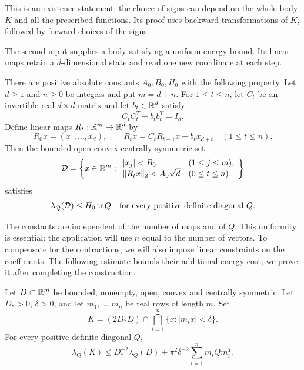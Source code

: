 This is an existence statement; the choice of signs can depend on the whole
body $K$ and all the prescribed functions.  Its proof uses backward
transformations of $K$, followed by forward choices of the signs.

The second input supplies a body satisfying a uniform energy bound.  Its
linear maps retain a $d$-dimensional state and read one new coordinate at
each step.

\begin{proposition}\label{prop:filtered}
There are positive absolute constants $A_0,B_0,H_0$ with the following
property.  Let $d\ge1$ and $n\ge0$ be integers and put $m=d+n$.  For
$1\le t\le n$, let $C_t$ be an invertible real $d\times d$ matrix and let
$b_t\in\mathbb R^d$ satisfy
\[
 C_tC_t^T+b_tb_t^T=I_d.
\]
Define linear maps $R_t:\mathbb R^m\to\mathbb R^d$ by
\begin{equation}\label{eq:filter-recursion}
 R_0x=(x_1,\ldots,x_d),\qquad
 R_tx=C_tR_{t-1}x+b_tx_{d+t}\quad(1\le t\le n).
\end{equation}
Then the bounded open convex centrally symmetric set
\begin{equation}\label{eq:filtered-body}
 \mathcal D=
 \left\{x\in\mathbb R^m:
 \begin{array}{ll}
 |x_j|<B_0 & (1\le j\le m),\\
 \lVert R_tx\rVert_2<A_0\sqrt d & (0\le t\le n)
 \end{array}\right\}
\end{equation}
satisfies
\[
 \lambda_Q(\mathcal D)\le H_0\operatorname{tr} Q
 \quad\text{for every positive definite diagonal }Q.
\]
\end{proposition}

The constants are independent of the number of maps and of $Q$.  This
uniformity is essential: the application will use $n$ equal to the number
of vectors.  To compensate for the contractions, we will also impose linear
constraints on the coefficients.  The following estimate bounds their
additional energy cost; we prove it after completing the construction.

\begin{lemma}\label{lem:slab-energy}
Let $D\subset\mathbb R^m$ be bounded, nonempty, open, convex and centrally
symmetric.  Let $D_*>0$, $\delta>0$, and let $m_1,\ldots,m_n$ be real
rows of length $m$.  Set
\[
 K=(2D_*D)\cap\bigcap_{i=1}^n\{x:|m_i x|<\delta\}.
\]
For every positive definite diagonal $Q$,
\begin{equation}\label{eq:slab-energy}
 \lambda_Q(K)
 \le D_*^{-2}\lambda_Q(D)
     +\pi^2\delta^{-2}\sum_{i=1}^n m_iQm_i^T.
\end{equation}
\end{lemma}

